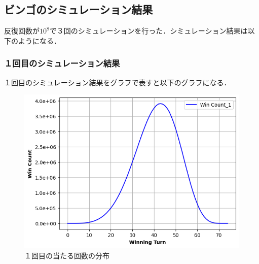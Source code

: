 \documentclass[a4j, titlepage]{jarticle}
\begin{document}
      \subsection{ビンゴのシミュレーション結果}
        反復回数が$10^8$で３回のシミュレーションを行った．シミュレーション結果は以下のようになる．
        \clearpage

        \subsubsection{１回目のシミュレーション結果}
        １回目のシミュレーション結果をグラフで表すと以下のグラフになる．
        \begin{figure}[htb]
          \begin{center}
            \includegraphics[scale=0.55]{../Dir_bingo_new/img_bingo1.png}
            \caption{１回目の当たる回数の分布}
            \label{img:bingo1}
          \end{center}
        \end{figure}
\end{document}
